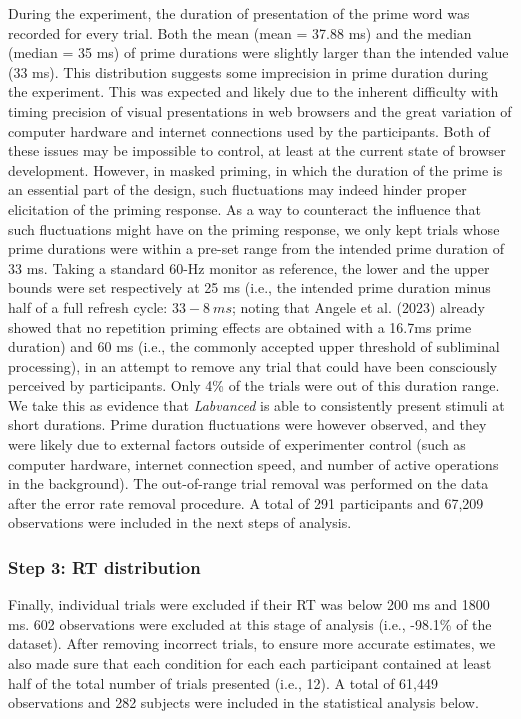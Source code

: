 \documentclass[
]{interact}
\begin{document}
During the experiment, the duration of presentation of the prime word
was recorded for every trial. Both the mean (mean = 37.88 ms) and the
median (median = 35 ms) of prime durations were slightly larger than the
intended value (33 ms). This distribution suggests some imprecision in
prime duration during the experiment. This was expected and likely due
to the inherent difficulty with timing precision of visual presentations
in web browsers and the great variation of computer hardware and
internet connections used by the participants. Both of these issues may
be impossible to control, at least at the current state of browser
development. However, in masked priming, in which the duration of the
prime is an essential part of the design, such fluctuations may indeed
hinder proper elicitation of the priming response. As a way to
counteract the influence that such fluctuations might have on the
priming response, we only kept trials whose prime durations were within
a pre-set range from the intended prime duration of 33 ms. Taking a
standard 60-Hz monitor as reference, the lower and the upper bounds were
set respectively at 25 ms (i.e., the intended prime duration minus half
of a full refresh cycle: \(33-8~ ms\); noting that Angele et al. (2023)
already showed that no repetition priming effects are obtained with a
16.7ms prime duration) and 60 ms (i.e., the commonly accepted upper
threshold of subliminal processing), in an attempt to remove any trial
that could have been consciously perceived by participants. Only 4\% of
the trials were out of this duration range. We take this as evidence
that \emph{Labvanced} is able to consistently present stimuli at short
durations. Prime duration fluctuations were however observed, and they
were likely due to external factors outside of experimenter control
(such as computer hardware, internet connection speed, and number of
active operations in the background). The out-of-range trial removal was
performed on the data after the error rate removal procedure. A total of
291 participants and 67,209 observations were included in the next steps
of analysis.

\subsubsection{Step 3: RT distribution}\label{sec-exp1-analysis-RT}

Finally, individual trials were excluded if their RT was below 200 ms
and 1800 ms. 602 observations were excluded at this stage of analysis
(i.e., -98.1\% of the dataset). After removing incorrect trials, to
ensure more accurate estimates, we also made sure that each condition
for each each participant contained at least half of the total number of
trials presented (i.e., 12). A total of 61,449 observations and 282
subjects were included in the statistical analysis below.
\end{document}
